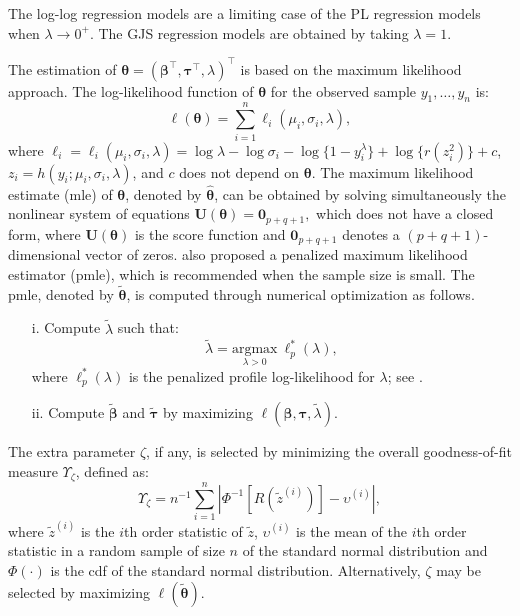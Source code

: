 The log-log regression models are a limiting case of the PL regression models when $\lambda \rightarrow 0^+$. The GJS regression models \citep{LemonteBazan2016} are obtained by taking $\lambda = 1$. 

The estimation of $\bm{\theta}=(\bm{\beta}^{\top},\bm{\tau}^{\top}, \lambda)^{\top}$ is based on the maximum likelihood approach. The log-likelihood function of $\bm{\theta}$ for the observed sample $y_1,\ldots,y_n$ is:
%
\begin{equation*}
\ell (\bm{\theta}) = \sum_{i=1}^{n} \ell_i(\mu_i, \sigma_i, \lambda), \label{logver}
\end{equation*}
%
where $\ell_i= \ell_i(\mu_i, \sigma_i, \lambda) = \log \lambda - \log \sigma_i - \log\{1-y_i^\lambda \} + \log\{ r(z_i^2)\} + c$, $z_i = h(y_i; \mu_i, \sigma_i, \lambda)$, and $c$ does not depend on $\bm{\theta}$. The maximum likelihood estimate (mle) of $\bm{\theta}$, denoted by $\widehat{\bm{\theta}}$, can be obtained by solving simultaneously the nonlinear system of equations $\textbf{U}(\bm{\theta}) = \bm{0}_{p+q+1},$ which does not have a closed form, where $\textbf{U}(\bm{\theta})$ is the score function and $\bm{0}_{p+q+1}$ denotes a $(p+q+1)$-dimensional vector of zeros. \cite{QueirozFerrari2023} also proposed a penalized maximum likelihood estimator (pmle), which is recommended when the sample size is small. The pmle, denoted by $\widetilde{\bm{\theta}}$, is computed through numerical optimization as follows.
\begin{itemize}
\item[i.] Compute $\widetilde{\lambda}$ such that:
\[
\widetilde{\lambda} = \underset{\lambda>0}{\mathrm{argmax}}~\ell_p^*(\lambda),
\]
where $\ell_p^* (\lambda)$ is the penalized profile log-likelihood for $\lambda$; see \citet[Equation 7]{QueirozFerrari2023}.
\item[ii.] Compute $\widetilde{\bm{\beta}}$ and $\widetilde{\bm{\tau}}$ by maximizing $\ell(\bm{\beta}, \bm{\tau}, \widetilde{\lambda})$.
\end{itemize}

The extra parameter $\zeta$, if any, is selected by minimizing the overall goodness-of-fit measure $\Upsilon_\zeta$, defined as:
\begin{equation*}
\Upsilon_\zeta = n^{-1} \displaystyle \sum_{i=1}^n | \Phi^{-1}[R(\widetilde{z}^{(i)})] - \upsilon^{(i)}|,
\end{equation*}
where $\widetilde{z}^{(i)}$ is the $i$th order statistic of $\widetilde{z}$, $\upsilon^{(i)}$ is the mean of the $i$th order statistic in a random sample of size $n$ of the standard normal distribution and $\Phi(\cdot)$ is the cdf of the standard normal distribution. Alternatively, $\zeta$ may be selected by maximizing $\ell(\tilde{\bm{\theta}})$.


